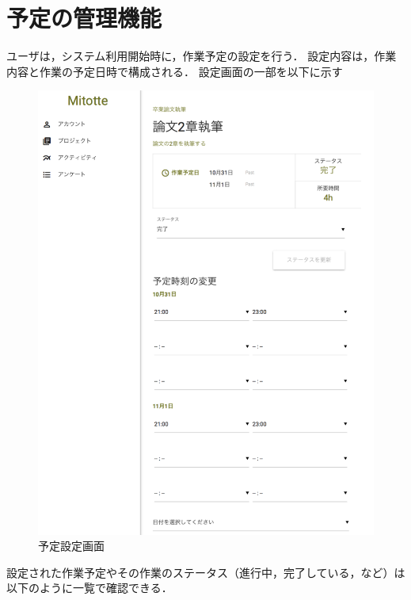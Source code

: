 \clearpage

\section{予定の管理機能}
ユーザは，システム利用開始時に，作業予定の設定を行う．
設定内容は，作業内容と作業の予定日時で構成される．
設定画面の一部を以下に示す

\begin{figure}[h]
  \begin{center}
  \includegraphics[width=12.0cm]{graphics/mitotte01.png}
  \caption{予定設定画面}
  \end{center}
\end{figure}

\clearpage

設定された作業予定やその作業のステータス（進行中，完了している，など）は
以下のように一覧で確認できる．

